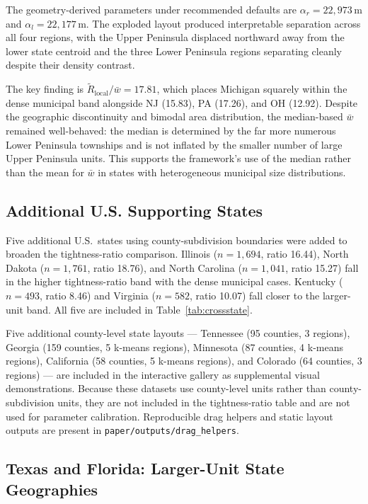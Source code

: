 \documentclass[12pt, a4paper]{article}
\numberwithin{equation}{section}
\begin{document}
The geometry-derived parameters under recommended defaults are $\alpha_r = 22{,}973$\,m and $\alpha_l = 22{,}177$\,m. The exploded layout produced interpretable separation across all four regions, with the Upper Peninsula displaced northward away from the lower state centroid and the three Lower Peninsula regions separating cleanly despite their density contrast.

The key finding is $\widetilde{R}_{\text{local}}/\bar{w} = 17.81$, which places Michigan squarely within the dense municipal band alongside NJ (15.83), PA (17.26), and OH (12.92). Despite the geographic discontinuity and bimodal area distribution, the median-based $\bar{w}$ remained well-behaved: the median is determined by the far more numerous Lower Peninsula townships and is not inflated by the smaller number of large Upper Peninsula units. This supports the framework's use of the median rather than the mean for $\bar{w}$ in states with heterogeneous municipal size distributions.

\subsection{Additional U.S. Supporting States}
\label{sec:supporting}

Five additional U.S.\ states using county-subdivision boundaries were added to broaden the tightness-ratio comparison. Illinois ($n=1{,}694$, ratio 16.44), North Dakota ($n=1{,}761$, ratio 18.76), and North Carolina ($n=1{,}041$, ratio 15.27) fall in the higher tightness-ratio band with the dense municipal cases. Kentucky ($n=493$, ratio 8.46) and Virginia ($n=582$, ratio 10.07) fall closer to the larger-unit band. All five are included in Table~\ref{tab:crossstate}.

Five additional county-level state layouts --- Tennessee (95 counties, 3 regions), Georgia (159 counties, 5 k-means regions), Minnesota (87 counties, 4 k-means regions), California (58 counties, 5 k-means regions), and Colorado (64 counties, 3 regions) --- are included in the interactive gallery as supplemental visual demonstrations. Because these datasets use county-level units rather than county-subdivision units, they are not included in the tightness-ratio table and are not used for parameter calibration. Reproducible drag helpers and static layout outputs are present in \texttt{paper/outputs/drag\_helpers}.

\subsection{Texas and Florida: Larger-Unit State Geographies}
\end{document}
